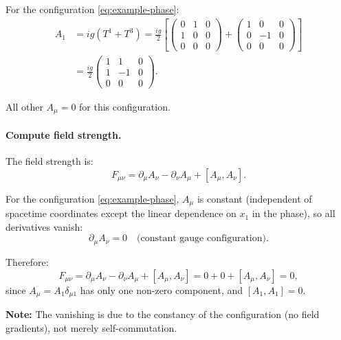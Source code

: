For the configuration \eqref{eq:example-phase}:
\begin{align}
A_1 &= i g (T^1 + T^3) = \frac{ig}{2} \left[\begin{pmatrix} 0 & 1 & 0 \\ 1 & 0 & 0 \\ 0 & 0 & 0 \end{pmatrix} + \begin{pmatrix} 1 & 0 & 0 \\ 0 & -1 & 0 \\ 0 & 0 & 0 \end{pmatrix}\right] \nonumber \\
&= \frac{ig}{2} \begin{pmatrix} 1 & 1 & 0 \\ 1 & -1 & 0 \\ 0 & 0 & 0 \end{pmatrix}.
\label{eq:A1-example}
\end{align}

All other $A_\mu = 0$ for this configuration.

\paragraph{Compute field strength.} The field strength is:
\begin{equation}
F_{\mu\nu} = \partial_\mu A_\nu - \partial_\nu A_\mu + [A_\mu, A_\nu].
\label{eq:F-example}
\end{equation}

For the configuration \eqref{eq:example-phase}, $A_\mu$ is constant (independent of spacetime coordinates except the linear dependence on $x_1$ in the phase), so all derivatives vanish:
\begin{equation}
\partial_\mu A_\nu = 0 \quad \text{(constant gauge configuration)}.
\label{eq:derivatives-zero}
\end{equation}

Therefore:
\begin{equation}
F_{\mu\nu} = \partial_\mu A_\nu - \partial_\nu A_\mu + [A_\mu, A_\nu] = 0 + 0 + [A_\mu, A_\nu] = 0,
\label{eq:F-vanishes}
\end{equation}
since $A_\mu = A_1 \delta_{\mu 1}$ has only one non-zero component, and $[A_1, A_1] = 0$.

\textbf{Note:} The vanishing is due to the constancy of the configuration (no field gradients), not merely self-commutation.


